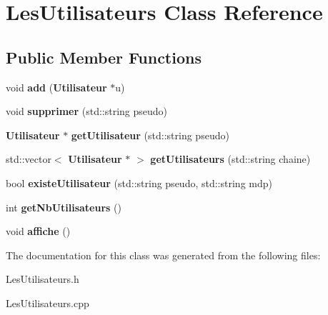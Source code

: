 \section{Les\-Utilisateurs Class Reference}
\label{class_les_utilisateurs}
\subsection*{Public Member Functions}
\begin{DoxyCompactItemize}
\item 
void {\bfseries add} ({\bf Utilisateur} $\ast$u)\label{class_les_utilisateurs_ab5c478d010984c3357b3d6ea67460b8e}

\item 
void {\bfseries supprimer} (std\-::string pseudo)\label{class_les_utilisateurs_a3ce112f12307d71f0d9cb74bc2cb506a}

\item 
{\bf Utilisateur} $\ast$ {\bfseries get\-Utilisateur} (std\-::string pseudo)\label{class_les_utilisateurs_a7246fbe92f69bf2940a713430c56aa31}

\item 
std\-::vector$<$ {\bf Utilisateur} $\ast$ $>$ {\bfseries get\-Utilisateurs} (std\-::string chaine)\label{class_les_utilisateurs_a0d551f67d5d5c0c1ecd240f13bb285ba}

\item 
bool {\bfseries existe\-Utilisateur} (std\-::string pseudo, std\-::string mdp)\label{class_les_utilisateurs_a0a06030c9a660be944b00a9300ae2044}

\item 
int {\bfseries get\-Nb\-Utilisateurs} ()\label{class_les_utilisateurs_ad825cc92534444913bf5f42416abd562}

\item 
void {\bfseries affiche} ()\label{class_les_utilisateurs_a88613e64e91ce36d0566cc7dfd3ed12d}

\end{DoxyCompactItemize}


The documentation for this class was generated from the following files\-:\begin{DoxyCompactItemize}
\item 
Les\-Utilisateurs.\-h\item 
Les\-Utilisateurs.\-cpp\end{DoxyCompactItemize}
